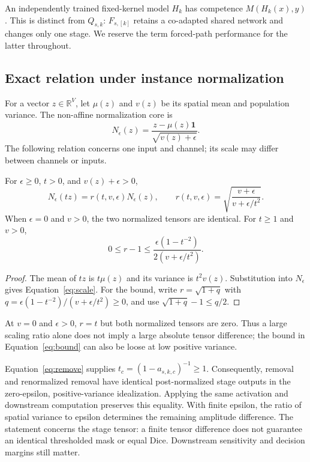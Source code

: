 \documentclass[mathematics,article,submit,pdftex,moreauthors]{Definitions/mdpi}
\begin{document}
An independently trained fixed-kernel model $H_k$ has competence
$M(H_k(x),y)$. This is distinct from $Q_{s,k}$: $F_{s,[k]}$ retains a
co-adapted shared network and changes only one stage. We reserve the term
forced-path performance for the latter throughout.

\subsection{Exact relation under instance normalization}
For a vector $z\in\mathbb{R}^{V}$, let $\mu(z)$ and $v(z)$ be its spatial
mean and population variance. The non-affine normalization core is
\begin{equation}
 N_\epsilon(z)=\frac{z-\mu(z)\mathbf{1}}{\sqrt{v(z)+\epsilon}}.
\end{equation}
The following relation concerns one input and channel; its scale may differ
between channels or inputs.

\begin{Proposition}\label{prop:scale}
For $\epsilon\geq0$, $t>0$, and $v(z)+\epsilon>0$,
\begin{equation}\label{eq:scale}
 N_\epsilon(tz)=r(t,v,\epsilon)N_\epsilon(z),\qquad
 r(t,v,\epsilon)=\sqrt{\frac{v+\epsilon}{v+\epsilon/t^2}}.
\end{equation}
When $\epsilon=0$ and $v>0$, the two normalized tensors are identical.
For $t\geq1$ and $v>0$,
\begin{equation}\label{eq:bound}
 0\leq r-1\leq\frac{\epsilon(1-t^{-2})}{2(v+\epsilon/t^2)}.
\end{equation}
\end{Proposition}
\begin{proof}
The mean of $tz$ is $t\mu(z)$ and its variance is $t^2v(z)$.
Substitution into $N_\epsilon$ gives Equation~\eqref{eq:scale}.
For the bound, write
$r=\sqrt{1+q}$ with
$q=\epsilon(1-t^{-2})/(v+\epsilon/t^2)\geq0$, and use
$\sqrt{1+q}-1\leq q/2$.
\end{proof}

At $v=0$ and $\epsilon>0$, $r=t$ but both normalized tensors are zero.
Thus a large scaling ratio alone does not imply a large absolute tensor
difference; the bound in Equation~\eqref{eq:bound} can also be loose at low
positive variance.

Equation~\eqref{eq:remove} supplies $t_c=(1-a_{s,k,c})^{-1}\geq1$.
Consequently, removal and renormalized removal have identical post-normalized
stage outputs in the zero-epsilon, positive-variance idealization. Applying
the same activation and downstream computation preserves this equality.
With finite epsilon, the ratio of spatial variance to epsilon determines the
remaining amplitude difference. The statement concerns the stage tensor:
a finite tensor difference does not guarantee an identical thresholded mask
or equal Dice. Downstream sensitivity and decision margins still matter.
\end{document}
